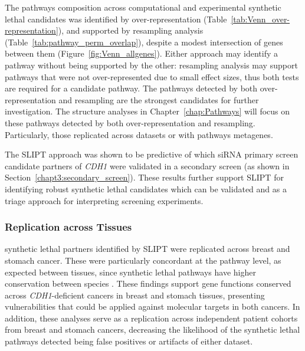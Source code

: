 The \glspl{pathway} composition across computational and experimental \gls{synthetic lethal} candidates was identified by over-represent\-ation (Table~\ref{tab:Venn_over-representation}), and supported by resampling analysis (Table~\ref{tab:pathway_perm_overlap}), despite a modest intersection of genes between them (Figure~\ref{fig:Venn_allgenes}). Either approach may identify a \gls{pathway} without being supported by the other: resampling analysis may support \glspl{pathway} that were not over-represent\-ed due to small effect sizes, thus both tests are required for a candidate \gls{pathway}.
%
The \glspl{pathway} detected by both over-represent\-ation and resampling are the strongest candidates for further investigation. The  structure analyses in Chapter~\ref{chap:Pathways} will focus on these \glspl{pathway} detected by both over-representation and resampling. Particularly, those replicated across datasets or with \glspl{pathway} \glspl{metagene}. %

The \gls{SLIPT} approach was shown to be predictive of which \gls{siRNA} primary screen candidate partners of \textit{CDH1} were validated in a secondary screen (as shown in Section~\ref{chapt3:secondary_screen}). These results further support \gls{SLIPT} for identifying robust \gls{synthetic lethal} candidates which can be validated and as a triage approach for interpreting screening experiments.

\subsubsection{Replication across Tissues}

\Gls{synthetic lethal} partners identified by \gls{SLIPT} were replicated across breast and stomach cancer. These were particularly concordant at the \gls{pathway} level, as expected between tissues, since \gls{synthetic lethal} \glspl{pathway} have higher conservation between species \citep{Dixon2008}. These findings support gene functions conserved across \textit{CDH1}-deficient cancers in breast and stomach tissues, presenting vulnerabilities that could be applied against molecular targets in both cancers. In addition, these analyses serve as a replication across independent patient cohorts from breast and stomach cancers, decreasing the likelihood of the \gls{synthetic lethal} \glspl{pathway} detected being false positives or artifacts of either dataset.

